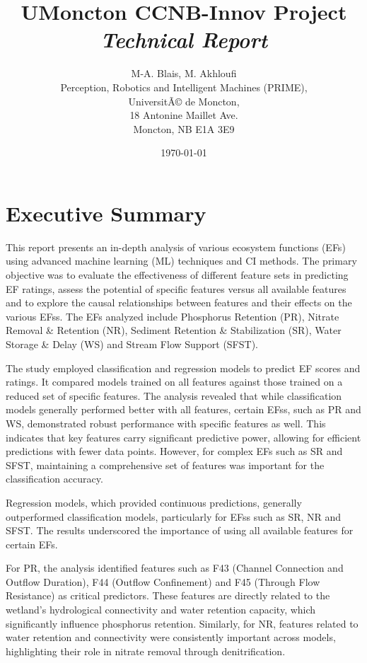 \documentclass[12pt,letterpaper]{article}
\title{\textbf{UMoncton CCNB-Innov Project} 
\textit{Technical Report}}
\author{M-A. Blais, M. Akhloufi \\
Perception, Robotics and Intelligent Machines (PRIME), \\
UniversitÃ© de Moncton, \\
18 Antonine Maillet Ave. \\
Moncton, NB E1A 3E9}
\date{\today}
\begin{document}
\maketitle
\thispagestyle{empty}



\clearpage 
\thispagestyle{plain}
\tableofcontents %

\section*{Executive Summary}

This report presents an in-depth analysis of various ecosystem functions (\acp{EF}) using advanced machine learning (\ac{ML}) techniques and \ac{CI} methods.
The primary objective was to evaluate the effectiveness of different feature sets in predicting \ac{EF} ratings, assess the potential of specific features versus all available features and to explore the causal relationships between features and their effects on the various \acp{EF}s.
The \acp{EF} analyzed include Phosphorus Retention (\ac{PR}), Nitrate Removal \& Retention (\ac{NR}), Sediment Retention \& Stabilization (\ac{SR}), Water Storage \& Delay (\ac{WS}) and Stream Flow Support (\ac{SFST}).

The study employed classification and regression models to predict \ac{EF} scores and ratings.
It compared models trained on all features against those trained on a reduced set of specific features.
The analysis revealed that while classification models generally performed better with all features, certain \acp{EF}s, such as \ac{PR} and \ac{WS}, demonstrated robust performance with specific features as well.
This indicates that key features carry significant predictive power, allowing for efficient predictions with fewer data points.
However, for complex \ac{EF}s such as \ac{SR} and \ac{SFST}, maintaining a comprehensive set of features was important for the classification accuracy.

Regression models, which provided continuous predictions, generally outperformed classification models, particularly for \acp{EF}s such as \ac{SR}, \ac{NR} and \ac{SFST}.
The results underscored the importance of using all available features for certain \ac{EF}s.

For \ac{PR}, the analysis identified features such as F43 (Channel Connection and Outflow Duration), F44 (Outflow Confinement) and F45 (Through Flow Resistance) as critical predictors.
These features are directly related to the wetland's hydrological connectivity and water retention capacity, which significantly influence phosphorus retention.
Similarly, for \ac{NR}, features related to water retention and connectivity were consistently important across models, highlighting their role in nitrate removal through denitrification.
\end{document}
